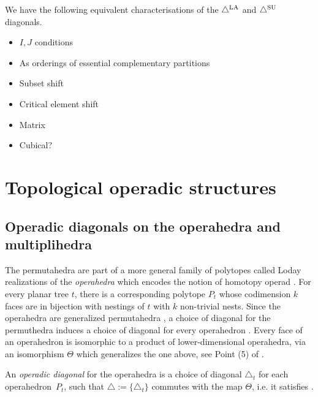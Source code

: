 We have the following equivalent characterisations of the $\triangle^{\mathrm{LA}}$ and $\triangle^{\mathrm{SU}}$ diagonals. 
\begin{itemize}
    \item $I,J$ conditions
    \item As orderings of essential complementary partitions
    \item Subset shift
    \item Critical element shift
    \item Matrix
    \item Cubical?
\end{itemize}









\section{Topological operadic structures}

\subsection{Operadic diagonals on the operahedra and multiplihedra}

The permutahedra are part of a more general family of polytopes called Loday realizations of the \emph{operahedra} \cite[Def. 2.9]{LA21} which encodes the notion of homotopy operad \cite[Def. 4.11]{LA21}.
For every planar tree $t$, there is a corresponding polytope $P_t$ whose codimension $k$ faces are in bijection with nestings of $t$ with $k$ non-trivial nests.
Since the operahedra are generalized permutahedra \cite[Cor. 2.16]{LA21}, a choice of diagonal for the permuthedra induces a choice of diagonal for every operahedron \cite[Cor. 1.31]{LA21}.
Every face of an operahedron is isomorphic to a product of lower-dimensional operahedra, via an isomorphism $\Theta$ which generalizes the one above, see Point (5) of \cite[Prop. 2.3]{LA21}.

\begin{definition}
    An \emph{operadic diagonal} for the operahedra is a choice of diagonal $\triangle_t$ for each operahedron~$P_t$, such that $\triangle:=\{\triangle_t\}$ commutes with the map $\Theta$, i.e. it satisfies \cite[Prop. 4.14]{LA21}.
\end{definition}

